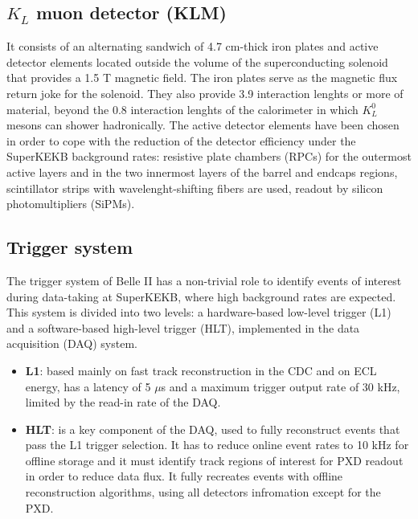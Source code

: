 \subsection{$K_{L}$ muon detector (KLM)}

It consists of an alternating sandwich of 4.7 cm-thick iron plates and active detector elements located outside the volume of the superconducting solenoid that provides a 1.5 T magnetic field. The iron plates serve as the magnetic flux return joke for the solenoid. They also provide 3.9 interaction lenghts or more of material, beyond the 0.8 interaction lenghts of the calorimeter in which $K_{L}^{0}$ mesons can shower hadronically. The active detector elements have been chosen in order to cope with the reduction of the detector efficiency under the SuperKEKB background rates: resistive plate chambers (RPCs) for the outermost active layers and in the two innermost layers of the barrel and endcaps regions, scintillator strips with wavelenght-shifting fibers are used, readout by silicon photomultipliers (SiPMs).\\

\subsection{Trigger system}

The trigger system of Belle II has a non-trivial role to identify events of interest during data-taking at SuperKEKB, where high background rates are expected. 
This system is divided into two levels: a hardware-based low-level trigger (L1) and a software-based high-level trigger (HLT), implemented in the data acquisition (DAQ) system. 

\begin{itemize}
\item \textbf{L1}: based mainly on fast track reconstruction in the CDC and on ECL energy, has a latency of 5 $\mu$s and a maximum trigger output rate of 30 kHz, limited by the read-in rate of the DAQ.
\item \textbf{HLT}: is a key component of the DAQ, used to fully reconstruct events that pass the L1 trigger selection. It has to reduce online event rates to 10 kHz for offline storage and it must identify track regions of interest for PXD readout in order to reduce data flux. It fully recreates events with offline reconstruction algorithms, using all detectors infromation except for the PXD.
\end{itemize}




